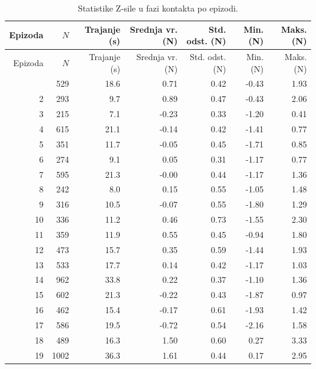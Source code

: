 \begin{longtable}{rrrrrrr}
  \caption{Statistike Z-sile u fazi kontakta po epizodi.}
  \label{tab:contact_forces} \\
  \toprule
  Epizoda & $N$ & Trajanje (s) & Srednja vr. (N) & Std. odst. (N) & Min. (N) & Maks. (N) \\
  \midrule
  \endfirsthead
  \toprule
  Epizoda & $N$ & Trajanje (s) & Srednja vr. (N) & Std. odst. (N) & Min. (N) & Maks. (N) \\
  \midrule
  \endhead
  \midrule
  \endfoot
  \bottomrule
  \endlastfoot
  1   &  529 &  18.6 &    0.71 &   0.42 &    -0.43 &    1.93 \\
  2   &  293 &   9.7 &    0.89 &   0.47 &    -0.43 &    2.06 \\
  3   &  215 &   7.1 &   -0.23 &   0.33 &    -1.20 &    0.41 \\
  4   &  615 &  21.1 &   -0.14 &   0.42 &    -1.41 &    0.77 \\
  5   &  351 &  11.7 &   -0.05 &   0.45 &    -1.71 &    0.85 \\
  6   &  274 &   9.1 &    0.05 &   0.31 &    -1.17 &    0.77 \\
  7   &  595 &  21.3 &   -0.00 &   0.44 &    -1.17 &    1.36 \\
  8   &  242 &   8.0 &    0.15 &   0.55 &    -1.05 &    1.48 \\
  9   &  316 &  10.5 &   -0.07 &   0.55 &    -1.80 &    1.29 \\
  10  &  336 &  11.2 &    0.46 &   0.73 &    -1.55 &    2.30 \\
  11  &  359 &  11.9 &    0.55 &   0.45 &    -0.94 &    1.80 \\
  12  &  473 &  15.7 &    0.35 &   0.59 &    -1.44 &    1.93 \\
  13  &  533 &  17.7 &    0.14 &   0.42 &    -1.17 &    1.03 \\
  14  &  962 &  33.8 &    0.22 &   0.37 &    -1.10 &    1.36 \\
  15  &  602 &  21.3 &   -0.22 &   0.43 &    -1.87 &    0.97 \\
  16  &  462 &  15.4 &   -0.17 &   0.61 &    -1.93 &    1.42 \\
  17  &  586 &  19.5 &   -0.72 &   0.54 &    -2.16 &    1.58 \\
  18  &  489 &  16.3 &    1.50 &   0.60 &     0.27 &    3.33 \\
  19  & 1002 &  36.3 &    1.61 &   0.44 &     0.17 &    2.95 \\

\end{longtable}
